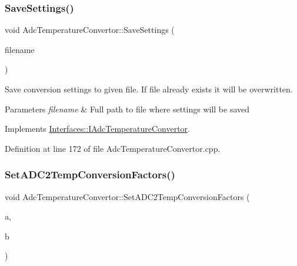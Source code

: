 \subsubsection{\texorpdfstring{Save\+Settings()}{SaveSettings()}}
{\footnotesize\ttfamily void Adc\+Temperature\+Convertor\+::\+Save\+Settings (\begin{DoxyParamCaption}\item[{Q\+String}]{filename }\end{DoxyParamCaption})\hspace{0.3cm}{\ttfamily [virtual]}}



Save conversion settings to given file. If file already exists it will be overwritten. 


\begin{DoxyParams}{Parameters}
{\em filename} & Full path to file where settings will be saved \\
\hline
\end{DoxyParams}


Implements \hyperlink{class_interfaces_1_1_i_adc_temperature_convertor_a6631e979e067ab78d3e5c337449876ac}{Interfaces\+::\+I\+Adc\+Temperature\+Convertor}.



Definition at line 172 of file Adc\+Temperature\+Convertor.\+cpp.

\mbox{\label{class_adc_temperature_convertor_a5a19355f805554763e914e5b2216d5f6}} 
\subsubsection{\texorpdfstring{Set\+A\+D\+C2\+Temp\+Conversion\+Factors()}{SetADC2TempConversionFactors()}}
{\footnotesize\ttfamily void Adc\+Temperature\+Convertor\+::\+Set\+A\+D\+C2\+Temp\+Conversion\+Factors (\begin{DoxyParamCaption}\item[{double}]{a,  }\item[{double}]{b }\end{DoxyParamCaption})\hspace{0.3cm}{\ttfamily [virtual]}}



